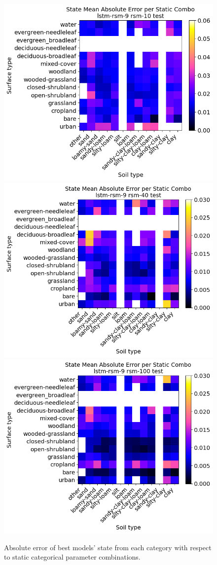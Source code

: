 \begin{figure}[hp!]
    \includegraphics[width=.32\linewidth,draft=false]{figures/static-combos/eval_test_lstm-rsm-9_rsm-10_static-combos_abs-err_state.png}
    \includegraphics[width=.32\linewidth,draft=false]{figures/static-combos/eval_test_lstm-rsm-9_rsm-40_static-combos_abs-err_state.png}
    \includegraphics[width=.32\linewidth,draft=false]{figures/static-combos/eval_test_lstm-rsm-9_rsm-100_static-combos_abs-err_state.png}


    \caption{Absolute error of best models' state from each category with respect to static categorical parameter combinations.}
    \label{best-static-abserr}
\end{figure}

